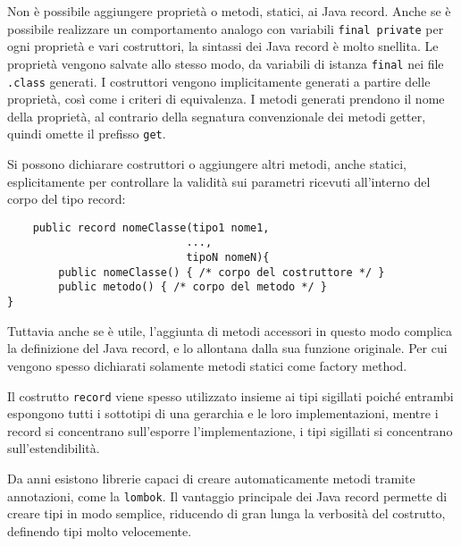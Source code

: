 \documentclass{article}
\numberwithin{equation}{subsection}
\begin{document}
Non è possibile aggiungere proprietà o metodi, statici, ai Java record. Anche se è possibile realizzare un comportamento analogo con variabili \verb|final private| per ogni proprietà e vari costruttori, la 
sintassi dei Java record è molto snellita. Le proprietà vengono salvate allo stesso modo, da variabili di istanza \verb|final| nei file \verb|.class| generati. 
I costruttori vengono implicitamente generati a partire delle proprietà, così come i criteri di equivalenza. 
I metodi generati prendono il nome della proprietà, al contrario della segnatura convenzionale dei metodi getter, quindi omette il prefisso \verb|get|. 

Si possono dichiarare costruttori o aggiungere altri metodi, anche statici, esplicitamente per controllare la validità sui parametri ricevuti all'interno del corpo del tipo record:
\begin{verbatim}
    public record nomeClasse(tipo1 nome1, 
                            ..., 
                            tipoN nomeN){
        public nomeClasse() { /* corpo del costruttore */ }
        public metodo() { /* corpo del metodo */ }                            
}
\end{verbatim}

Tuttavia anche se è utile, l'aggiunta di metodi accessori in questo modo complica la definizione del Java record, e lo allontana dalla sua funzione originale. Per cui vengono spesso dichiarati solamente 
metodi statici come factory method. 

Il costrutto \verb|record| viene spesso utilizzato insieme ai tipi sigillati poiché entrambi espongono tutti i sottotipi di una gerarchia e le loro implementazioni, mentre i record si concentrano sull'esporre 
l'implementazione, i tipi sigillati si concentrano sull'estendibilità. 

Da anni esistono librerie capaci di creare automaticamente metodi tramite annotazioni, come la \verb|lombok|. Il vantaggio principale dei Java record permette di 
creare tipi in modo semplice, riducendo di gran lunga la verbosità del costrutto, definendo tipi molto velocemente.
\end{document}
